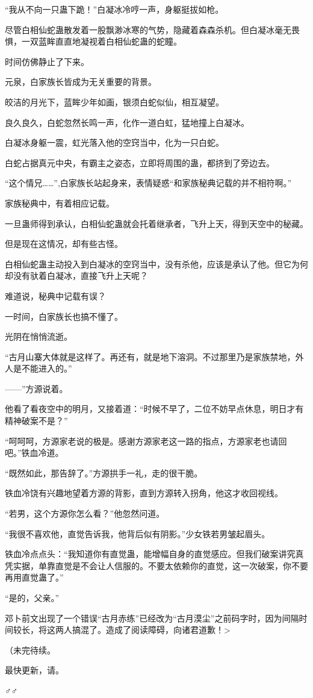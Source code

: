 \begin{this_body}
“我从不向一只蛊下跪！”白凝冰冷哼一声，身躯挺拔如枪。

尽管白相仙蛇蛊散发着一股飘渺冰寒的气势，隐藏着森森杀机。但白凝冰毫无畏惧，一双蓝眸直直地凝视着白相仙蛇蛊的蛇瞳。

时间仿佛静止了下来。

元泉，白家族长皆成为无关重要的背景。

皎洁的月光下，蓝眸少年如画，银须白蛇似仙，相互凝望。

良久良久，白蛇忽然长鸣一声，化作一道白虹，猛地撞上白凝冰。

白凝冰身躯一震，虹光落入他的空窍当中，化为一只白蛇。

白蛇占据真元中央，有霸主之姿态，立即将周围的蛊，都挤到了旁边去。

“这个情兄……”,白家族长站起身来，表情疑惑“和家族秘典记载的并不相符啊。”

家族秘典中，有着相应记载。

一旦蛊师得到承认，白相仙蛇蛊就会托着继承者，飞升上天，得到天空中的秘藏。

但是现在这情况，却有些古怪。

白相仙蛇蛊主动投入到白凝冰的空窍当中，没有杀他，应该是承认了他。但它为何却没有驮着白凝冰，直接飞升上天呢？

难道说，秘典中记载有误？

一时间，白家族长也搞不懂了。

光阴在悄悄流逝。

“古月山寨大体就是这样了。再还有，就是地下溶洞。不过那里乃是家族禁地，外人是不能进入的。”

——”方源说着。

他看了看夜空中的明月，又接着道：“时候不早了，二位不妨早点休息，明日才有精神破案不是？”

“呵呵呵，方源家老说的极是。感谢方源家老这一路的指点，方源家老也请回吧。”铁血冷道。

“既然如此，那告辞了。”方源拱手一礼，走的很干脆。

铁血冷饶有兴趣地望着方源的背影，直到方源转入拐角，他这才收回视线。

“若男，这个方源你怎么看？”他忽然问道。

“我很不喜欢他，直觉告诉我，他背后似有阴影。”少女铁若男皱起眉头。

铁血冷点点头：“我知道你有直觉蛊，能增幅自身的直觉感应。但我们破案讲究真凭实据，单靠直觉是不会让人信服的。不要太依赖你的直觉，这一次破案，你不要再用直觉蛊了。”

“是的，父亲。”

邓卜前文出现了一个错误“古月赤练”已经改为“古月漠尘”之前码字时，因为间隔时间较长，将这两人搞混了。造成了阅读障碍，向诸君道歉！>

（未完待续。

最快更新，请。

♂♂

\end{this_body}

